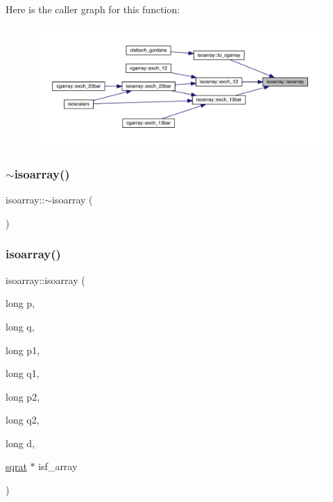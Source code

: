 Here is the caller graph for this function\+:
\nopagebreak
\begin{figure}[H]
\begin{center}
\leavevmode
\includegraphics[width=350pt]{d5/dd9/classisoarray_a2255ec3a14431cdc95ea8d0b0150fde6_icgraph}
\end{center}
\end{figure}
\mbox{\label{classisoarray_ab1ff7ca3e0edb468608b42d2d2aad08b}} 
\subsubsection{\texorpdfstring{$\sim$isoarray()}{~isoarray()}\hspace{0.1cm}{\footnotesize\ttfamily [1/3]}}
{\footnotesize\ttfamily isoarray\+::$\sim$isoarray (\begin{DoxyParamCaption}{ }\end{DoxyParamCaption})}

\mbox{\label{classisoarray_a2255ec3a14431cdc95ea8d0b0150fde6}} 
\subsubsection{\texorpdfstring{isoarray()}{isoarray()}\hspace{0.1cm}{\footnotesize\ttfamily [2/3]}}
{\footnotesize\ttfamily isoarray\+::isoarray (\begin{DoxyParamCaption}\item[{long}]{p,  }\item[{long}]{q,  }\item[{long}]{p1,  }\item[{long}]{q1,  }\item[{long}]{p2,  }\item[{long}]{q2,  }\item[{long}]{d,  }\item[{\mbox{\hyperlink{classsqrat}{sqrat}} $\ast$}]{isf\+\_\+array }\end{DoxyParamCaption})}


